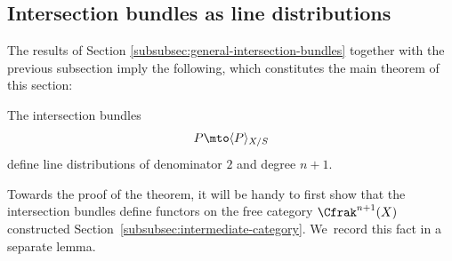 \subsection{Intersection bundles as line distributions}\label{subsec:Intbunaslindib}

The results of Section \ref{subsubsec:general-intersection-bundles} together with the previous subsection imply the following, which constitutes the main theorem of this section:

\begin{theorem}\label{thm:Elkik-distribution}
The intersection bundles
\begin{displaymath}
P \mto \langle P \rangle_{X/S}
\end{displaymath} define line distributions of denominator $2$ and degree $n+1$.
\end{theorem}

Towards the proof of the theorem, it will be handy to first show that the intersection bundles define functors on the free category $\Cfrak^{n+1}(X)$ constructed Section~\ref{subsubsec:intermediate-category}. We~record this fact in a separate lemma.

